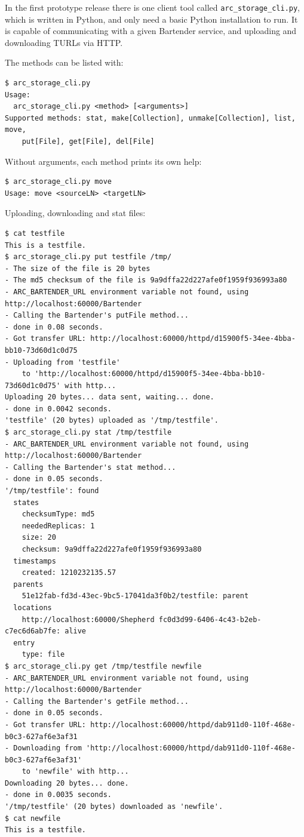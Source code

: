 \documentclass{book}
\begin{document}
In the first prototype release there is one client tool called \verb!arc_storage_cli.py!, which is written in Python, and only need a basic Python installation to run. It is capable of communicating with a given Bartender service, and uploading and downloading TURLs via HTTP.

The methods can be listed with:
\begin{verbatim}
$ arc_storage_cli.py
Usage:
  arc_storage_cli.py <method> [<arguments>]
Supported methods: stat, make[Collection], unmake[Collection], list, move,
    put[File], get[File], del[File]
\end{verbatim}
Without arguments, each method prints its own help:
\begin{verbatim}
$ arc_storage_cli.py move
Usage: move <sourceLN> <targetLN>
\end{verbatim}

Uploading, downloading and stat files:

\begin{verbatim}
$ cat testfile 
This is a testfile.
$ arc_storage_cli.py put testfile /tmp/
- The size of the file is 20 bytes
- The md5 checksum of the file is 9a9dffa22d227afe0f1959f936993a80
- ARC_BARTENDER_URL environment variable not found, using http://localhost:60000/Bartender
- Calling the Bartender's putFile method...
- done in 0.08 seconds.
- Got transfer URL: http://localhost:60000/httpd/d15900f5-34ee-4bba-bb10-73d60d1c0d75
- Uploading from 'testfile'
    to 'http://localhost:60000/httpd/d15900f5-34ee-4bba-bb10-73d60d1c0d75' with http...
Uploading 20 bytes... data sent, waiting... done.
- done in 0.0042 seconds.
'testfile' (20 bytes) uploaded as '/tmp/testfile'.
$ arc_storage_cli.py stat /tmp/testfile
- ARC_BARTENDER_URL environment variable not found, using http://localhost:60000/Bartender
- Calling the Bartender's stat method...
- done in 0.05 seconds.
'/tmp/testfile': found
  states
    checksumType: md5
    neededReplicas: 1
    size: 20
    checksum: 9a9dffa22d227afe0f1959f936993a80
  timestamps
    created: 1210232135.57
  parents
    51e12fab-fd3d-43ec-9bc5-17041da3f0b2/testfile: parent
  locations
    http://localhost:60000/Shepherd fc0d3d99-6406-4c43-b2eb-c7ec6d6ab7fe: alive
  entry
    type: file
$ arc_storage_cli.py get /tmp/testfile newfile
- ARC_BARTENDER_URL environment variable not found, using http://localhost:60000/Bartender
- Calling the Bartender's getFile method...
- done in 0.05 seconds.
- Got transfer URL: http://localhost:60000/httpd/dab911d0-110f-468e-b0c3-627af6e3af31
- Downloading from 'http://localhost:60000/httpd/dab911d0-110f-468e-b0c3-627af6e3af31'
    to 'newfile' with http...
Downloading 20 bytes... done.
- done in 0.0035 seconds.
'/tmp/testfile' (20 bytes) downloaded as 'newfile'.
$ cat newfile 
This is a testfile.
\end{verbatim}
\end{document}
